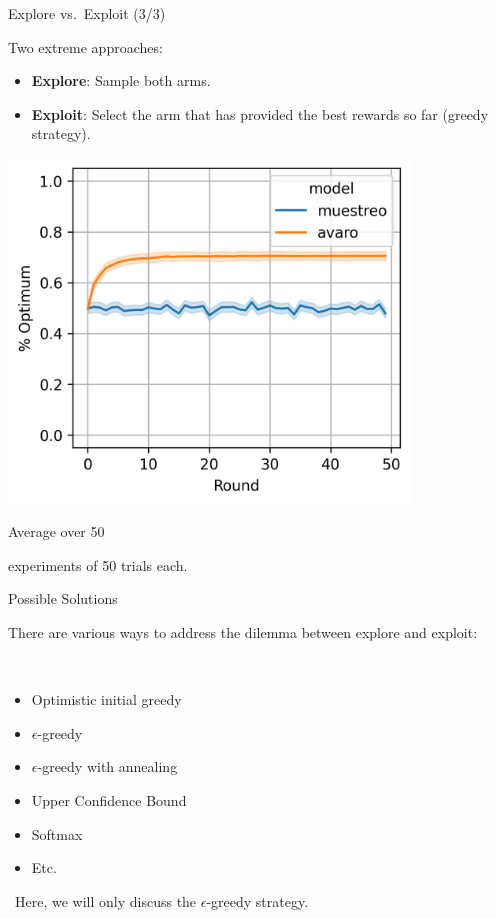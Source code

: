 \documentclass[11pt]{beamer}
\begin{document}
\begin{frame}{Explore vs.~Exploit (3/3)}

Two extreme approaches:

\begin{itemize}
\item \textbf{Explore}: Sample both arms.
\item \textbf{Exploit}: Select the arm that has provided the best rewards so far (greedy strategy).
\end{itemize}

\begin{minipage}{.6\linewidth}
\begin{center}
\includegraphics[width=0.8\textwidth]{images/muestreo_vs_explorar}
\end{center}
\end{minipage}\begin{minipage}{.4\linewidth}
Average over 50\par experiments of 50 trials each.
\end{minipage}

\end{frame}

\begin{frame}{Possible Solutions}

There are various ways to address the dilemma between explore and exploit:

\

\begin{itemize}
\item Optimistic initial greedy
\item $\epsilon$-greedy
\item $\epsilon$-greedy with annealing
\item Upper Confidence Bound
\item Softmax
\item Etc.
\end{itemize}

\vspace{\baselineskip}

\HandRight\ Here, we will only discuss the $\epsilon$-greedy strategy.

\end{frame}
\end{document}
